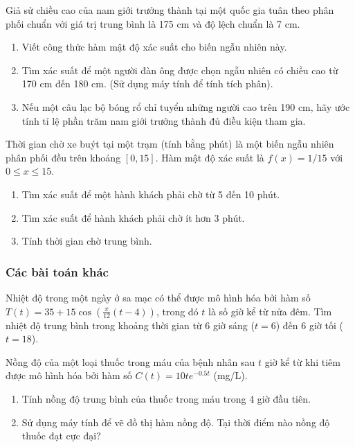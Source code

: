 \begin{exercise}
    Giả sử chiều cao của nam giới trưởng thành tại một quốc gia tuân theo phân phối chuẩn với giá trị trung bình là 175 cm và độ lệch chuẩn là 7 cm.
    \begin{enumerate}[label=(\alph*)]
        \item Viết công thức hàm mật độ xác suất cho biến ngẫu nhiên này.
        \item Tìm xác suất để một người đàn ông được chọn ngẫu nhiên có chiều cao từ 170 cm đến 180 cm. (Sử dụng máy tính để tính tích phân).
        \item Nếu một câu lạc bộ bóng rổ chỉ tuyển những người cao trên 190 cm, hãy ước tính tỉ lệ phần trăm nam giới trưởng thành đủ điều kiện tham gia.
    \end{enumerate}
\end{exercise}

\begin{exercise}
    Thời gian chờ xe buýt tại một trạm (tính bằng phút) là một biến ngẫu nhiên phân phối đều trên khoảng $[0, 15]$. Hàm mật độ xác suất là $f(x) = 1/15$ với $0 \le x \le 15$.
    \begin{enumerate}[label=(\alph*)]
        \item Tìm xác suất để một hành khách phải chờ từ 5 đến 10 phút.
        \item Tìm xác suất để hành khách phải chờ ít hơn 3 phút.
        \item Tính thời gian chờ trung bình.
    \end{enumerate}
\end{exercise}

\subsubsection{Các bài toán khác}

\begin{exercise}
    Nhiệt độ trong một ngày ở sa mạc có thể được mô hình hóa bởi hàm số $T(t) = 35 + 15\cos\left(\frac{\pi}{12}(t-4)\right)$, trong đó $t$ là số giờ kể từ nửa đêm. Tìm nhiệt độ trung bình trong khoảng thời gian từ 6 giờ sáng ($t=6$) đến 6 giờ tối ($t=18$).
\end{exercise}

\begin{exercise}
    Nồng độ của một loại thuốc trong máu của bệnh nhân sau $t$ giờ kể từ khi tiêm được mô hình hóa bởi hàm số $C(t) = 10te^{-0.5t}$ (mg/L).
    \begin{enumerate}[label=(\alph*)]
        \item Tính nồng độ trung bình của thuốc trong máu trong 4 giờ đầu tiên.
        \item Sử dụng máy tính để vẽ đồ thị hàm nồng độ. Tại thời điểm nào nồng độ thuốc đạt cực đại?
    \end{enumerate}
\end{exercise}


